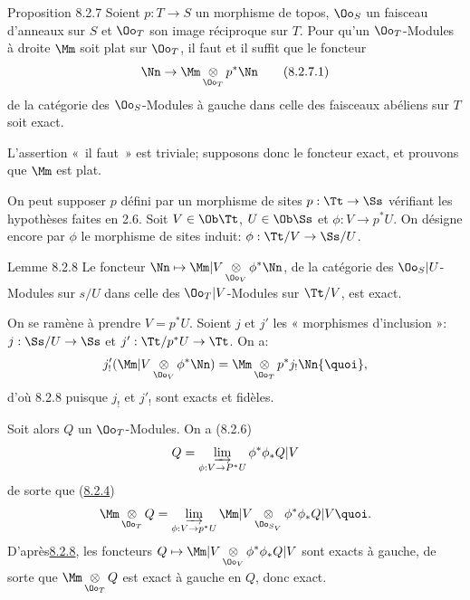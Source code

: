 \begin{enonce*}{Proposition 8.2.7}
Soient $p : T \to S$ un morphisme de topos, $\Oo_S$ un
faisceau d'anneaux sur $S$ et $\Oo_T$ son image réciproque sur
$T$. Pour qu'un $\Oo_T$-Modules à droite $\Mm$ soit
plat sur $\Oo_T$, il faut et il suffit que le foncteur
\begin{equation*}
\Nn \to \Mm \mathop{\otimes}_{\Oo_{T}} p^{\ast} \Nn\tag{8.2.7.1}
\end{equation*}
de la catégorie des $\Oo_S$-Modules à gauche dans celle des
faisceaux abéliens sur $T$ soit exact.
\end{enonce*}

L'assertion « il faut » est triviale; supposons donc le foncteur
 exact, et prouvons que $\Mm$ est plat.

On peut supposer $p$ défini par un morphisme de sites $p :
\Tt \to \Ss$ vérifiant les hypothèses faites en 2.6. Soit $V
\in \Ob \Tt$, $U \in \Ob \Ss$ et $\phi : V \to p^{\ast} U$. On désigne
encore par $\phi$ le morphisme de sites induit: $\phi :
\Tt/V \to \Ss/U$.

\begin{enonce*}{Lemme 8.2.8}
Le foncteur $\Nn \mapsto \Mm | V
\displaystyle\mathop{\otimes}_{\Oo_{V}} \phi^{\ast} \Nn$,
de la catégorie des $\Oo_S | U$-Modules sur $s/U$ dans celle
des $\Oo_T | V$-Modules sur $\Tt/V$, est exact.
\end{enonce*}

On se ramène à prendre $V = p^{\ast} U$. Soient $j$ et $j'$ les «
morphismes d'inclusion »: $j : \Ss / U \to \Ss$ et $j': \Tt /p^{\ast}
U \to \Tt$. On a:
$$
j'_{!} (\Mm | V \mathop{\otimes}_{\Oo_{V}} \phi^{\ast}
\Nn) = \Mm \mathop{\otimes}_{\Oo_T} p^{\ast} j_{!} \Nn{\quoi},
$$
d'où 8.2.8 puisque $j_{!}$ et $j'_{!}$ sont exacts et fidèles.

Soit alors $Q$ un $\Oo_T$-Modules. On a (8.2.6)
$$
Q = \varinjlim_{\phi : V \to P^{\ast} U} \phi^{\ast} \phi_{\ast} Q | V
$$
de sorte que (\hyperref[V.prop8.2.4]{8.2.4})
$$
\Mm \mathop{\otimes}_{\Oo_{T}} Q = \varinjlim_{\phi
  : V \to p^{\ast} U} \Mm | V
\mathop{\otimes}_{\Oo_{S_{V}}} \phi^{\ast} \phi_{\ast} Q | V {\quoi}.
$$
D'après\pageoriginale \hyperref[V.lem8.2.8]{8.2.8}, les foncteurs $Q \mapsto \Mm | V
\displaystyle\mathop{\otimes}_{\Oo_{V}} \phi^{\ast}
\phi_{\ast} Q | V$ sont exacts à gauche, de sorte
que $\Mm \displaystyle\mathop{\otimes}_{\Oo_T} Q$ est exact à
gauche en $Q$, donc exact.

